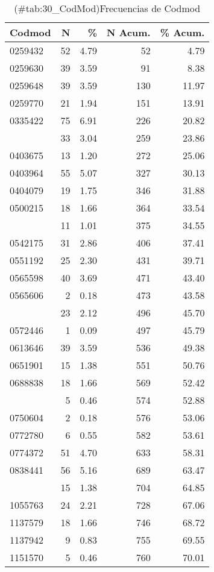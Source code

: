 \documentclass[
]{article}
\begin{document}
\begin{table}

\caption{(\#tab:30_CodMod)Frecuencias de Codmod}
\centering
\begin{tabular}[t]{lrrrr}
\toprule
Codmod & N & \% & N Acum. & \% Acum.\\
\midrule
0259432 & 52 & 4.79 & 52 & 4.79\\
0259630 & 39 & 3.59 & 91 & 8.38\\
0259648 & 39 & 3.59 & 130 & 11.97\\
0259770 & 21 & 1.94 & 151 & 13.91\\
0335422 & 75 & 6.91 & 226 & 20.82\\
\addlinespace
0403659 & 33 & 3.04 & 259 & 23.86\\
0403675 & 13 & 1.20 & 272 & 25.06\\
0403964 & 55 & 5.07 & 327 & 30.13\\
0404079 & 19 & 1.75 & 346 & 31.88\\
0500215 & 18 & 1.66 & 364 & 33.54\\
\addlinespace
0540062 & 11 & 1.01 & 375 & 34.55\\
0542175 & 31 & 2.86 & 406 & 37.41\\
0551192 & 25 & 2.30 & 431 & 39.71\\
0565598 & 40 & 3.69 & 471 & 43.40\\
0565606 & 2 & 0.18 & 473 & 43.58\\
\addlinespace
0565952 & 23 & 2.12 & 496 & 45.70\\
0572446 & 1 & 0.09 & 497 & 45.79\\
0613646 & 39 & 3.59 & 536 & 49.38\\
0651901 & 15 & 1.38 & 551 & 50.76\\
0688838 & 18 & 1.66 & 569 & 52.42\\
\addlinespace
0730275 & 5 & 0.46 & 574 & 52.88\\
0750604 & 2 & 0.18 & 576 & 53.06\\
0772780 & 6 & 0.55 & 582 & 53.61\\
0774372 & 51 & 4.70 & 633 & 58.31\\
0838441 & 56 & 5.16 & 689 & 63.47\\
\addlinespace
0930842 & 15 & 1.38 & 704 & 64.85\\
1055763 & 24 & 2.21 & 728 & 67.06\\
1137579 & 18 & 1.66 & 746 & 68.72\\
1137942 & 9 & 0.83 & 755 & 69.55\\
1151570 & 5 & 0.46 & 760 & 70.01\\

\end{tabular}
\end{table}
\end{document}

